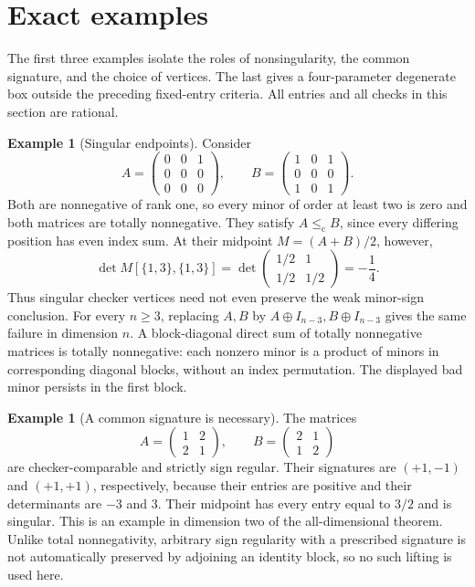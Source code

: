 \documentclass[11pt]{article}
\theoremstyle{definition}
\newtheorem{example}[theorem]{Example}
\theoremstyle{remark}
\numberwithin{equation}{section}
\newcommand{\chle}{\leq_{\mathrm c}}
\begin{document}
\section{Exact examples}\label{sec:examples}

The first three examples isolate the roles of nonsingularity,
the common signature, and the choice of vertices. The last gives a
four-parameter degenerate box outside the preceding fixed-entry
criteria. All entries and all checks in this section are rational.

\begin{example}[Singular endpoints]\label{ex:singular}
Consider
\[
 A=\begin{pmatrix}0&0&1\\0&0&0\\0&0&0\end{pmatrix},
 \qquad
 B=\begin{pmatrix}1&0&1\\0&0&0\\1&0&1\end{pmatrix}.
\]
Both are nonnegative of rank one, so every minor of order at
least two is zero and both matrices are totally nonnegative.
They satisfy $A\chle B$, since every differing position has
even index sum. At their midpoint $M=(A+B)/2$, however,
\[
 \det M[\{1,3\},\{1,3\}]
 =\det\begin{pmatrix}1/2&1\\1/2&1/2\end{pmatrix}
 =-\frac14.
\]
Thus singular checker vertices need not even preserve the weak
minor-sign conclusion. For every $n\geq3$, replacing $A,B$ by
$A\oplus I_{n-3},B\oplus I_{n-3}$ gives the same failure in
dimension $n$. A block-diagonal direct sum of totally nonnegative
matrices is totally nonnegative: each nonzero minor is a product
of minors in corresponding diagonal blocks, without an index
permutation. The displayed bad minor persists in the first block.
\end{example}

\begin{example}[A common signature is necessary]\label{ex:signature}
The matrices
\[
 A=\begin{pmatrix}1&2\\2&1\end{pmatrix},\qquad
 B=\begin{pmatrix}2&1\\1&2\end{pmatrix}
\]
are checker-comparable and strictly sign regular. Their signatures
are $(+1,-1)$ and $(+1,+1)$, respectively, because their entries
are positive and their determinants are $-3$ and $3$.
Their midpoint has every entry equal to $3/2$ and is singular.
This is an example in dimension two of the all-dimensional
theorem. Unlike total nonnegativity, arbitrary sign regularity
with a prescribed signature is not automatically preserved by
adjoining an identity block, so no such lifting is used here.
\end{example}
\end{document}
